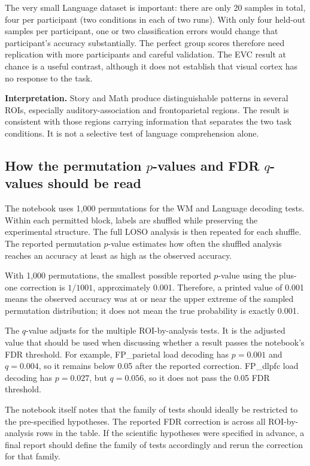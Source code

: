 \documentclass[11pt,a4paper]{article}
\begin{document}
The very small Language dataset is important: there are only 20 samples in total, four per participant (two conditions in each of two runs). With only four held-out samples per participant, one or two classification errors would change that participant's accuracy substantially. The perfect group scores therefore need replication with more participants and careful validation. The EVC result at chance is a useful contrast, although it does not establish that visual cortex has no response to the task.

\textbf{Interpretation.} Story and Math produce distinguishable patterns in several ROIs, especially auditory-association and frontoparietal regions. The result is consistent with those regions carrying information that separates the two task conditions. It is not a selective test of language comprehension alone.

\subsection{How the permutation \(p\)-values and FDR \(q\)-values should be read}

The notebook uses 1,000 permutations for the WM and Language decoding tests. Within each permitted block, labels are shuffled while preserving the experimental structure. The full LOSO analysis is then repeated for each shuffle. The reported permutation \(p\)-value estimates how often the shuffled analysis reaches an accuracy at least as high as the observed accuracy.

With 1,000 permutations, the smallest possible reported \(p\)-value using the plus-one correction is \(1/1001\), approximately 0.001. Therefore, a printed value of 0.001 means the observed accuracy was at or near the upper extreme of the sampled permutation distribution; it does not mean the true probability is exactly 0.001.

The \(q\)-value adjusts for the multiple ROI-by-analysis tests. It is the adjusted value that should be used when discussing whether a result passes the notebook's FDR threshold. For example, FP\_parietal load decoding has \(p=0.001\) and \(q=0.004\), so it remains below 0.05 after the reported correction. FP\_dlpfc load decoding has \(p=0.027\), but \(q=0.056\), so it does not pass the 0.05 FDR threshold.

The notebook itself notes that the family of tests should ideally be restricted to the pre-specified hypotheses. The reported FDR correction is across all ROI-by-analysis rows in the table. If the scientific hypotheses were specified in advance, a final report should define the family of tests accordingly and rerun the correction for that family.
\end{document}
